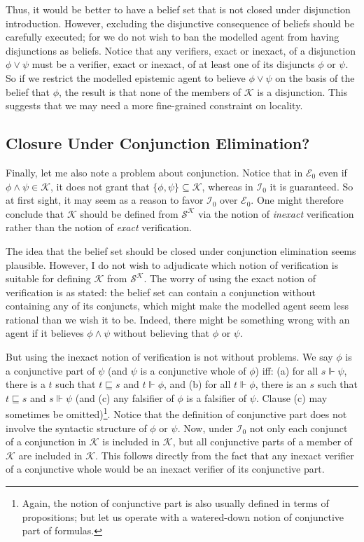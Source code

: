 \documentclass[12pt]{article}
\newcommand{\ver}{\Vdash}
\newcommand{\K}{\mathcal{K}}
\newcommand{\SK}{\mathcal{S}^\mathcal{K}}
\begin{document}
\par
Thus, it would be better to have a belief set that is not closed under disjunction introduction. However, excluding the disjunctive consequence of beliefs should be carefully executed; for we do not wish to ban the modelled agent from having disjunctions as beliefs. Notice that any verifiers, exact or inexact, of a disjunction $\phi \lor \psi$ must be a verifier, exact or inexact, of at least one of its disjuncts $\phi$ or $\psi$. So if we restrict the modelled epistemic agent to believe $\phi \lor \psi$ on the basis of the belief that $\phi$, the result is that none of the members of $\K$ is a disjunction. This suggests that we may need a more fine-grained constraint on locality.


\subsection{Closure Under Conjunction Elimination?}
Finally, let me also note a problem about conjunction. Notice that in $\mathcal{E}_0$ even if $\phi \land \psi \in \K$, it does not grant that $\{\phi, \psi\} \subseteq \K$, whereas in $\mathcal{I}_0$ it is guaranteed. So at first sight, it may seem as a reason to favor $\mathcal{I}_0$ over $\mathcal{E}_0$. One might therefore conclude that $\K$ should be defined from $\SK$ via the notion of \textit{inexact} verification rather than the notion of \textit{exact} verification. 
\par
The idea that the belief set should be closed under conjunction elimination seems plausible. However, I do not wish to adjudicate which notion of verification is suitable for defining $\K$ from $\SK$. The worry of using the exact notion of verification is as stated: the belief set can contain a conjunction without containing any of its conjuncts, which might make the modelled agent seem less rational than we wish it to be. Indeed, there might be something wrong with an agent if it believes $\phi \land \psi$ without believing that $\phi$ or $\psi$. 
\par
But using the inexact notion of verification is not without problems. We say $\phi$ is a conjunctive part of $\psi$ (and $\psi$ is a conjunctive whole of $\phi$) iff: (a) for all $s \ver \psi$, there is a $t$ such that $t \sqsubseteq s$ and $t \ver \phi$, and (b) for all $t \ver \phi$, there is an $s$ such that $t \sqsubseteq s$ and $s \ver \psi$ (and (c) any falsifier of $\phi$ is a falsifier of $\psi$. Clause (c) may sometimes be omitted)\footnote{Again, the notion of conjunctive part is also usually defined in terms of propositions; but let us operate with a watered-down notion of conjunctive part of formulas.}. Notice that the definition of conjunctive part does not involve the syntactic structure of $\phi$ or $\psi$. Now, under $\mathcal{I}_0$ not only each conjunct of a conjunction in $\K$ is included in $\K$, but all conjunctive parts of a member of $\K$ are included in $\K$. This follows directly from the fact that any inexact verifier of a conjunctive whole would be an inexact verifier of its conjunctive part. 
\end{document}
